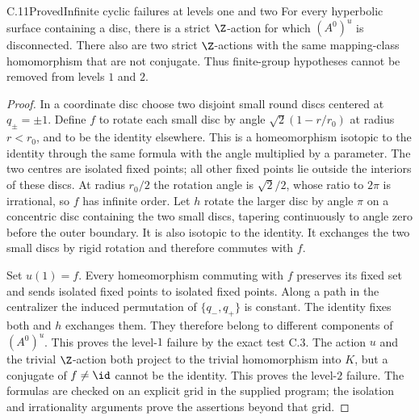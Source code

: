 \begin{claim}{C.11}{Proved}{Infinite cyclic failures at levels one and two}
For every hyperbolic surface containing a disc, there is a strict
$\Z$-action for which $(A^0)^u$ is disconnected. There also are two
strict $\Z$-actions with the same mapping-class homomorphism that are
not conjugate. Thus finite-group hypotheses cannot be removed from
levels $1$ and $2$.
\end{claim}
\begin{proof}
In a coordinate disc choose two disjoint small round discs centered at
$q_\pm=\pm1$. Define $f$ to rotate each small disc by angle
$\sqrt2(1-r/r_0)$ at radius $r<r_0$, and to be the identity elsewhere.
This is a homeomorphism isotopic to the identity through the same
formula with the angle multiplied by a parameter. The two centres are
isolated fixed points; all other fixed points lie outside the interiors
of these discs. At radius $r_0/2$ the rotation angle is
$\sqrt2/2$, whose ratio to $2\pi$ is irrational, so $f$ has infinite
order. Let $h$ rotate the larger disc by angle $\pi$ on a concentric disc
containing the two small discs, tapering continuously to angle zero
before the outer boundary. It is also isotopic to the identity.
It exchanges the two small discs by rigid rotation and therefore
commutes with $f$.

Set $u(1)=f$. Every homeomorphism commuting with $f$ preserves its fixed
set and sends isolated fixed points to isolated fixed points. Along a
path in the centralizer the induced permutation of $\{q_-,q_+\}$ is
constant. The identity fixes both and $h$ exchanges them. They therefore
belong to different components of $(A^0)^u$. This proves the level-$1$
failure by the exact test C.3. The action $u$ and the trivial $\Z$-action
both project to the trivial homomorphism into $K$, but a conjugate of
$f\ne\id$ cannot be the identity. This proves the level-$2$ failure.
The formulas are checked on an explicit grid in the supplied program;
the isolation and irrationality arguments prove the assertions beyond
that grid.
\end{proof}

